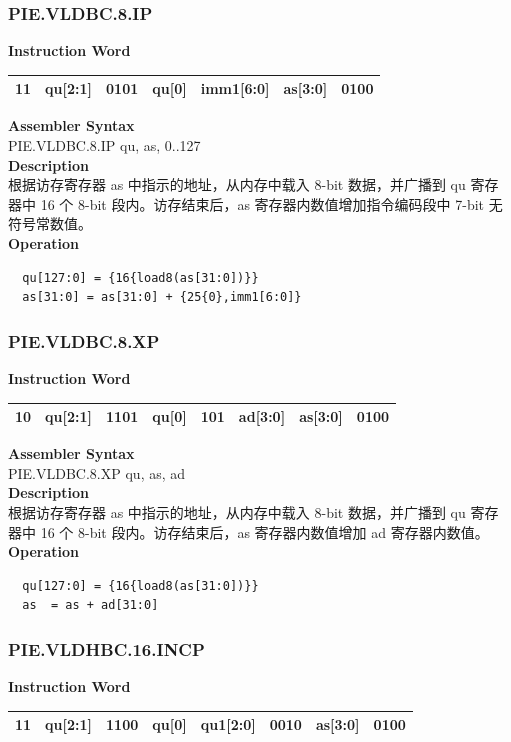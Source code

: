 \newpage
\subsubsection{PIE.VLDBC.8.IP}\label{instruction:PIEVLDBC8IP}
\setlength\tabcolsep{6pt}
\textbf{Instruction Word} \\
\begin{tabular}{|c|c|c|c|c|c|c|}
	\hline
	11 & qu[2:1] & 0101 & qu[0] & imm1[6:0] & as[3:0] & 0100 \\
	\hline
\end{tabular}

\textbf{Assembler Syntax} \\
PIE.VLDBC.8.IP qu, as, 0..127 \\
\textbf{Description} \\
根据访存寄存器 as 中指示的地址，从内存中载入 8-bit 数据，并广播到 qu 寄存器中 16 个 8-bit 段内。访存结束后，as 寄存器内数值增加指令编码段中 7-bit 无符号常数值。\\
\textbf{Operation}
\begin{lstlisting}
  qu[127:0] = {16{load8(as[31:0])}}
  as[31:0] = as[31:0] + {25{0},imm1[6:0]}
\end{lstlisting}

\newpage
\subsubsection{PIE.VLDBC.8.XP}\label{instruction:PIEVLDBC8XP}
\setlength\tabcolsep{6pt}
\textbf{Instruction Word} \\
\begin{tabular}{|c|c|c|c|c|c|c|c|}
	\hline
	10 & qu[2:1] & 1101 & qu[0] & 101 & ad[3:0] & as[3:0] & 0100 \\
	\hline
\end{tabular}

\textbf{Assembler Syntax} \\
PIE.VLDBC.8.XP qu, as, ad \\
\textbf{Description} \\
根据访存寄存器 as 中指示的地址，从内存中载入 8-bit 数据，并广播到 qu 寄存器中 16 个 8-bit 段内。访存结束后，as 寄存器内数值增加 ad 寄存器内数值。\\
\textbf{Operation}
\begin{lstlisting}
  qu[127:0] = {16{load8(as[31:0])}}
  as  = as + ad[31:0]
\end{lstlisting}

\newpage
\subsubsection{PIE.VLDHBC.16.INCP}\label{instruction:PIEVLDHBC16INCP}
\setlength\tabcolsep{6pt}
\textbf{Instruction Word} \\
\begin{tabular}{|c|c|c|c|c|c|c|c|}
	\hline
	11 & qu[2:1] & 1100 & qu[0] & qu1[2:0] & 0010 & as[3:0] & 0100 \\
	\hline
\end{tabular}

